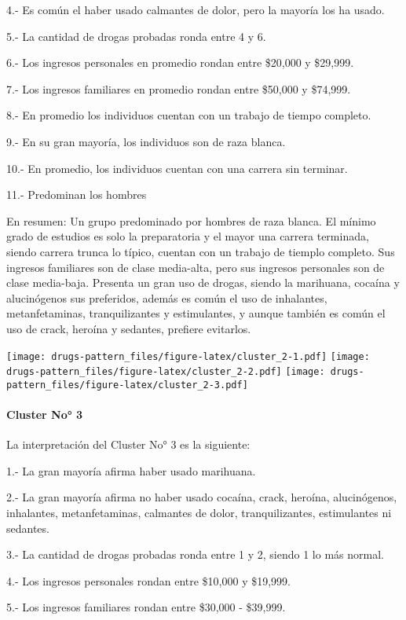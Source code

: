 \documentclass[]{article}
\let\oldparagraph\paragraph
\renewcommand{\paragraph}[1]{\oldparagraph{#1}\mbox{}}
\begin{document}
4.- Es común el haber usado calmantes de dolor, pero la mayoría los ha
usado.

5.- La cantidad de drogas probadas ronda entre 4 y 6.

6.- Los ingresos personales en promedio rondan entre \$20,000 y
\$29,999.

7.- Los ingresos familiares en promedio rondan entre \$50,000 y
\$74,999.

8.- En promedio los individuos cuentan con un trabajo de tiempo
completo.

9.- En su gran mayoría, los individuos son de raza blanca.

10.- En promedio, los individuos cuentan con una carrera sin terminar.

11.- Predominan los hombres

En resumen: Un grupo predominado por hombres de raza blanca. El mínimo
grado de estudios es solo la preparatoria y el mayor una carrera
terminada, siendo carrera trunca lo típico, cuentan con un trabajo de
tiemplo completo. Sus ingresos familiares son de clase media-alta, pero
sus ingresos personales son de clase media-baja. Presenta un gran uso de
drogas, siendo la marihuana, cocaína y alucinógenos sus preferidos,
además es común el uso de inhalantes, metanfetaminas, tranquilizantes y
estimulantes, y aunque también es común el uso de crack, heroína y
sedantes, prefiere evitarlos.

\texttt{[image: drugs-pattern\_files/figure-latex/cluster\_2-1.pdf]}
\texttt{[image: drugs-pattern\_files/figure-latex/cluster\_2-2.pdf]}
\texttt{[image: drugs-pattern\_files/figure-latex/cluster\_2-3.pdf]}

\paragraph{Cluster No° 3}\label{cluster-no-3}

La interpretación del Cluster No° 3 es la siguiente:

1.- La gran mayoría afirma haber usado marihuana.

2.- La gran mayoría afirma no haber usado cocaína, crack, heroína,
alucinógenos, inhalantes, metanfetaminas, calmantes de dolor,
tranquilizantes, estimulantes ni sedantes.

3.- La cantidad de drogas probadas ronda entre 1 y 2, siendo 1 lo más
normal.

4.- Los ingresos personales rondan entre \$10,000 y \$19,999.

5.- Los ingresos familiares rondan entre \$30,000 - \$39,999.
\end{document}
